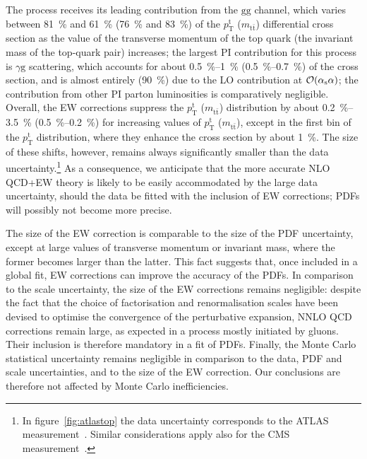 The process receives its leading contribution from the $\mathrm{gg}$ channel,
which varies between \SI{81}{\percent} and \SI{61}{\percent} (\SI{76}{\percent} and \SI{83}{\percent}) of the $p_\mathrm{T}^\mathrm{t}$
($m_{\mathrm{t}\bar{\mathrm{t}}}$) differential cross section as the value of the
transverse momentum of the top quark (the invariant mass of the top-quark pair)
increases; the largest PI contribution for this process is $\gamma\mathrm{g}$ scattering,
which accounts for about \SIrange{0.5}{1}{\percent} (\SIrange{0.5}{0.7}{\percent}) of the cross
section, and is almost entirely (\SI{90}{\percent}) due to the LO contribution at $\mathcal{O}(\alpha_\mathrm{s}\alpha)$; the contribution from other PI parton luminosities is comparatively
negligible. Overall, the EW corrections suppress the $p_\mathrm{T}^\mathrm{t}$
($m_{\mathrm{t}\bar{\mathrm{t}}}$) distribution by about \SIrange{0.2}{3.5}{\percent}
(\SIrange{0.5}{0.2}{\percent}) for increasing values of $p_\mathrm{T}^\mathrm{t}$
($m_{\mathrm{t}\bar{\mathrm{t}}}$), except in the first bin of the
$p_\mathrm{T}^\mathrm{t}$ distribution, where they enhance the cross section by
about \SI{1}{\percent}. The size of these shifts, however, remains always significantly
smaller than the data uncertainty.\footnote{In
  figure~\ref{fig:atlastop} the data uncertainty corresponds to the ATLAS
  measurement~\cite{Aad:2015auj}. Similar considerations apply also for the CMS
  measurement~\cite{Khachatryan:2015oaa}.}
As a consequence, we anticipate that the more accurate NLO QCD+EW theory is
likely to be easily accommodated by the large data uncertainty, should the data
be fitted with the inclusion of EW corrections; PDFs will possibly not become
more precise.

The size of the EW correction is comparable to the size of the PDF uncertainty,
except at large values of transverse momentum or invariant mass, where the
former becomes larger than the latter. This fact suggests that, once included in
a global fit, EW corrections can improve the accuracy of the PDFs. In comparison
to the scale uncertainty, the size of the EW corrections remains negligible:
despite the fact that the choice of factorisation and renormalisation scales
have been devised to optimise the convergence of the perturbative expansion,
NNLO QCD corrections remain large, as expected in a process mostly initiated
by gluons. Their inclusion is therefore mandatory in a fit of PDFs. Finally,
the Monte Carlo statistical uncertainty remains negligible in comparison to the
data, PDF and scale uncertainties, and to the size of the EW correction. Our
conclusions are therefore not affected by Monte Carlo inefficiencies.




